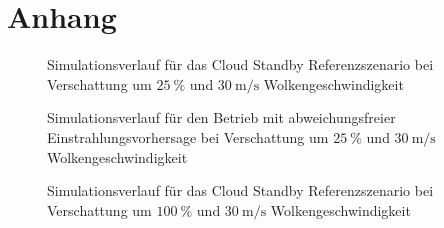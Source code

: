 \appendix
\chapter{Anhang}\label{ch_anhang}
\begin{figure}[h!]
    \centering
    \setlength{\fboxsep}{1pt}
    \setlength{\fboxrule}{1pt}
    \caption[Simulationsverlauf für das Cloud Standby Referenzszenario bei Verschattung um $\SI{25}{\percent}$ und $\SI{30}{\metre\per\second}$ Wolkengeschwindigkeit]{Simulationsverlauf für das Cloud Standby Referenzszenario bei Verschattung um $\SI{25}{\percent}$ und $\SI{30}{\metre\per\second}$ Wolkengeschwindigkeit}
    \label{fig_nocontrol7530}
\end{figure}

\begin{figure}[h!]
    \centering
    \setlength{\fboxsep}{1pt}
    \setlength{\fboxrule}{1pt}
    \caption[Simulationsverlauf für den Betrieb mit abweichungsfreier Einstrahlungsvorhersage bei Verschattung um $\SI{25}{\percent}$ und $\SI{30}{\metre\per\second}$ Wolkengeschwindigkeit]{Simulationsverlauf für den Betrieb mit abweichungsfreier Einstrahlungsvorhersage bei Verschattung um $\SI{25}{\percent}$ und $\SI{30}{\metre\per\second}$ Wolkengeschwindigkeit}
    \label{fig_allwissend7530}
\end{figure}

\begin{figure}[h!]
    \centering
    \setlength{\fboxsep}{1pt}
    \setlength{\fboxrule}{1pt}
    \caption[Simulationsverlauf für das Cloud Standby Referenzszenario bei Verschattung um $\SI{100}{\percent}$ und $\SI{30}{\metre\per\second}$ Wolkengeschwindigkeit]{Simulationsverlauf für das Cloud Standby Referenzszenario bei Verschattung um $\SI{100}{\percent}$ und $\SI{30}{\metre\per\second}$ Wolkengeschwindigkeit}
    \label{fig_cloudstandby0030}
\end{figure}


